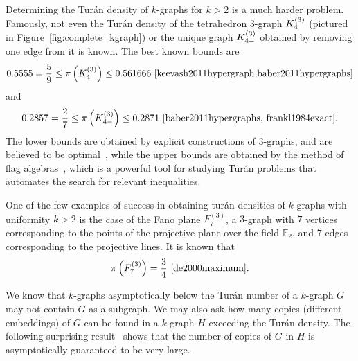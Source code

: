 Determining the Turán density of $k$-graphs for $k > 2$ is a much harder problem.
Famously, not even the Turán density of the tetrahedron $3$-graph $K^{(3)}_{4}$
(pictured in Figure~\ref{fig:complete_kgraph}) or the unique graph $K^{(3)}_{4-}$
obtained by removing one edge from it is known.
The best known bounds are
\[
    0.5555 = \frac{5}{9} \leq \pi\left(K^{(3)}_{4}\right) \leq 0.561666~\cite{keevash2011hypergraph,baber2011hypergraphs}
\]
and
\[
     0.2857 = \frac{2}{7} \leq \pi\left(K^{(3)}_{4-}\right) \leq 0.2871~\cite{baber2011hypergraphs, frankl1984exact}.
\]
The lower bounds are obtained by explicit constructions of $3$-graphs, and are believed to be optimal~\cite{keevash2011hypergraph},
while the upper bounds are obtained by the method of flag algebras~\cite{razborov2007flag},
which is a powerful tool for studying Turán problems that automates the search for relevant inequalities.

One of the few examples of success in obtaining turán densities of $k$-graphs with uniformity $k > 2$ is the case of
the Fano plane $F^{(3)}_7$, a $3$-graph with $7$ vertices corresponding to the points
of the projective plane over the field $\mathbb{F}_2$,
and $7$ edges corresponding to the projective lines.
It is known that
\[
    \pi\left(F^{(3)}_7\right) = \frac{3}{4}~\cite{de2000maximum}.
\]

We know that $k$-graphs asymptotically below the Turán number of a $k$-graph $G$
may not contain $G$ as a subgraph.
We may also ask how many copies (different embeddings) of $G$ can be found in a $k$-graph $H$
exceeding the Turán density.
The following surprising result~\cite{erdHos1983supersaturated} shows that the number of copies of $G$ in $H$
is asymptotically guaranteed to be very large.

